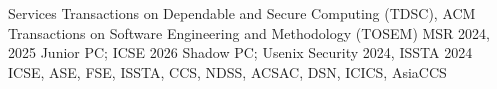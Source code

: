 
\begin{rubric}{Services}
	Transactions on Dependable and Secure Computing (TDSC), ACM Transactions on Software Engineering and Methodology (TOSEM)
	MSR 2024, 2025 Junior PC; ICSE 2026 Shadow PC;
	Usenix Security 2024, ISSTA 2024
        ICSE, ASE, FSE, ISSTA, CCS, NDSS, ACSAC, DSN, ICICS, AsiaCCS
\end{rubric}

